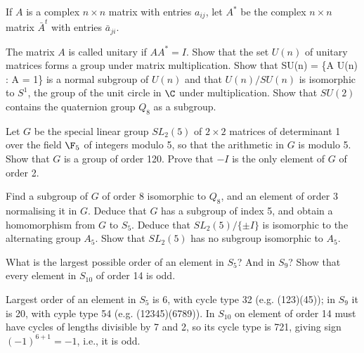 \begin{solution}[\bf Solution.]

\end{solution}

\begin{problem}If $A$ is a complex $n \times n$ matrix with entries $a_{ij}$, let $A^*$ be the complex $n \times n$ matrix $\bar{A}^t$ with entries $\bar{a}_{ji}$.

The matrix $A$ is called unitary if $AA^* = I$. Show that the set $U(n)$ of unitary matrices forms a group under matrix multiplication. Show that
\be
SU(n) = \{A \in U(n) : \det A = 1\}
\ee
is a normal subgroup of $U(n)$ and that $U(n)/SU(n)$ is isomorphic to $S^1$, the group of the unit circle in $\C$ under multiplication. Show that $SU(2)$ contains the quaternion group $Q_8$ as a subgroup.

\end{problem} 

\begin{solution}[\bf Solution.]

\end{solution}

\begin{problem}Let $G$ be the special linear group $SL_2(5)$ of $2\times 2$ matrices of determinant 1 over the field $\F_5$ of integers modulo 5, so that the arithmetic in $G$ is modulo 5. Show that $G$ is a group of order 120. Prove that $-I$ is the only element of $G$ of order 2.

Find a subgroup of $G$ of order 8 isomorphic to $Q_8$, and an element of order 3 normalising it in $G$. Deduce that $G$ has a subgroup of index 5, and obtain a homomorphism from $G$ to $S_5$. Deduce that $SL_2(5)/\{\pm I\}$ is isomorphic to the alternating group $A_5$. Show that $SL_2(5)$ has no subgroup isomorphic to $A_5$.

\end{problem} 

\begin{solution}[\bf Solution.]

\end{solution}



\begin{problem}What is the largest possible order of an element in $S_5$? And in $S_9$? Show that every element in $S_{10}$ of order 14 is odd.

\end{problem} 

\begin{solution}[\bf Solution.]Largest order of an element in $S_5$ is 6, with cycle type 32 (e.g. (123)(45)); in $S_9$ it is 20, with cyple type 54 (e.g. (12345)(6789)). In $S_{10}$ on element of order 14 must have cycles of lengths divisible by 7 and 2, so its cycle type is 721, giving sign $(-1)^{6+1} = -1$, i.e., it is odd. 

\end{solution}

